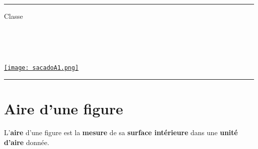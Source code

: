 \documentclass[a4paper,dvipsnames]{article}
\begin{document}

\fancyhead[C]{}
\hrule\medskip %
\begin{minipage}{0.295\textwidth} 
\raggedright
Classe \myClasse \hfill\\
\myDiscipline \hfill\\
\myParcours \hfill\\
\end{minipage}
\begin{minipage}{0.4\textwidth} 
\centering 
\scshape\huge
\textcolor{sacado_purple}{\myTitle} \\ 
\normalsize 
\end{minipage}
\begin{minipage}{0.295\textwidth} 
\raggedleft
\href{https://sacado.xyz/}{\texttt{[image: sacadoA1.png]}}
\end{minipage}
\medskip \hrule
\bigskip


\section{Aire d'une figure}

\begin{Def}
L'\textbf{aire} d'une figure est la \textbf{mesure} de sa \textbf{surface intérieure} dans une \textbf{unité d'aire} donnée.
\end{Def}
\end{document}

